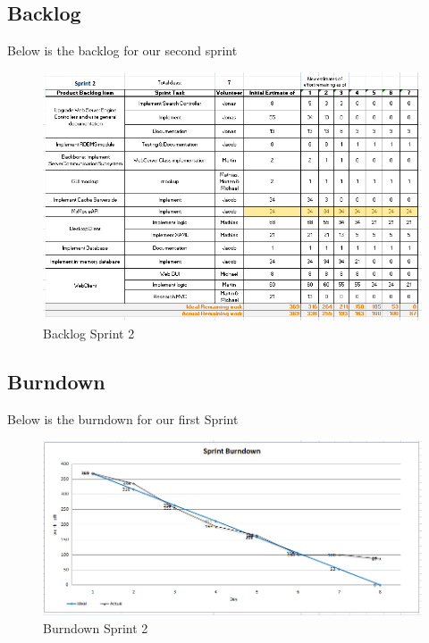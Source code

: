 \subsection{Backlog}
Below is the backlog for our second sprint
\begin{figure}[h]
\begin{center}
\includegraphics[scale=0.6]{img/SCRUM/backlogSprint2.png}
\caption{Backlog Sprint 2}
\label{fig:Backlog Sprint 2}
\end{center}
\end{figure}

\newpage
\subsection{Burndown}
Below is the burndown for our first Sprint
\begin{figure}[h]
\begin{center}
\includegraphics[scale=0.55]{img/SCRUM/burndownSprint2.png}
\caption{Burndown Sprint 2}
\label{fig:Burndown Sprint 2}
\end{center}
\end{figure}



